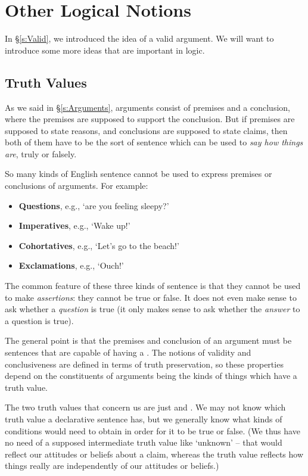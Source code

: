 \chapter{Other Logical Notions}\label{s:BasicNotions}

In §\ref{s:Valid}, we introduced the idea of a valid argument. We will want to introduce some more ideas that are important in logic.

\section{Truth Values}\label{s:truthvalues}
As we said in §\ref{s:Arguments}, arguments consist of premises and a conclusion, where the premises are supposed to support the conclusion. But if premises are supposed to state reasons, and conclusions are supposed to state claims, then both of them have to be the sort of sentence which can be used to \emph{say how things are}, truly or falsely. 

So many kinds of English sentence cannot be used to express premises or conclusions of arguments. For example:
	\begin{itemize}
		\item \textbf{Questions}, e.g., `are you feeling sleepy?'
		\item \textbf{Imperatives}, e.g., `Wake up!'
		\item \textbf{Cohortatives}, e.g., `Let's go to the beach!'
		\item \textbf{Exclamations}, e.g., `Ouch!'
	\end{itemize}
The common feature of these three kinds of sentence is that they cannot be used to make \emph{assertions}: they cannot be true or false. It does not even make sense to ask whether a \emph{question} is true (it only makes sense to ask whether the \emph{answer} to a question is true).



The general point is that the premises and conclusion of an argument must be sentences that are capable of having a . The notions of validity and conclusiveness are defined in terms of truth preservation, so these properties depend on the constituents of arguments being the kinds of things which have a truth value.

The two truth values that concern us are just  and . We may not know which truth value a declarative sentence has, but we generally know what kinds of conditions would need to obtain in order for it to be true or false. (We thus have no need of a supposed intermediate truth value like `unknown' – that would reflect our attitudes or beliefs about a claim, whereas the truth value reflects how things really are independently of our attitudes or beliefs.)

